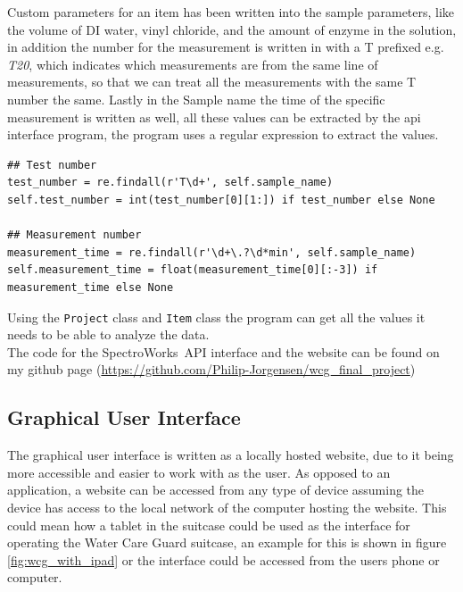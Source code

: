 \documentclass{article}
\newenvironment{code}{\captionsetup{type=listing}}{}
\begin{document}
Custom parameters for an item has been written into the sample parameters, like the volume of DI water, vinyl chloride, and the amount of enzyme in the solution, in addition the number for the measurement is written in with a T prefixed e.g. \textit{T20}, which indicates which measurements are from the same line of measurements, so that we can treat all the measurements with the same T number the same.
Lastly in the Sample name the time of the specific measurement is written as well, all these values can be extracted by the api interface program, the program uses a regular expression to extract the values.

\begin{code}
\begin{verbatim}
## Test number
test_number = re.findall(r'T\d+', self.sample_name)
self.test_number = int(test_number[0][1:]) if test_number else None

## Measurement number
measurement_time = re.findall(r'\d+\.?\d*min', self.sample_name)
self.measurement_time = float(measurement_time[0][:-3]) if measurement_time else None
\end{verbatim}
\label{code:custom_parameters}
\end{code}
\medskip

Using the \texttt{Project} class and \texttt{Item} class the program can get all the values it needs to be able to analyze the data.\\
The code for the SpectroWorks\texttrademark\ API interface and the website can be found on my github page (\url{https://github.com/Philip-Jorgensen/wcg_final_project})

\subsection{Graphical User Interface}
The graphical user interface is written as a locally hosted website, due to it being more accessible and easier to work with as the user.
As opposed to an application, a website can be accessed from any type of device assuming the device has access to the local network of the computer hosting the website.
This could mean how a tablet in the suitcase could be used as the interface for operating the Water Care Guard suitcase, an example for this is shown in figure \ref{fig:wcg_with_ipad} or the interface could be accessed from the users phone or computer.
\end{document}
